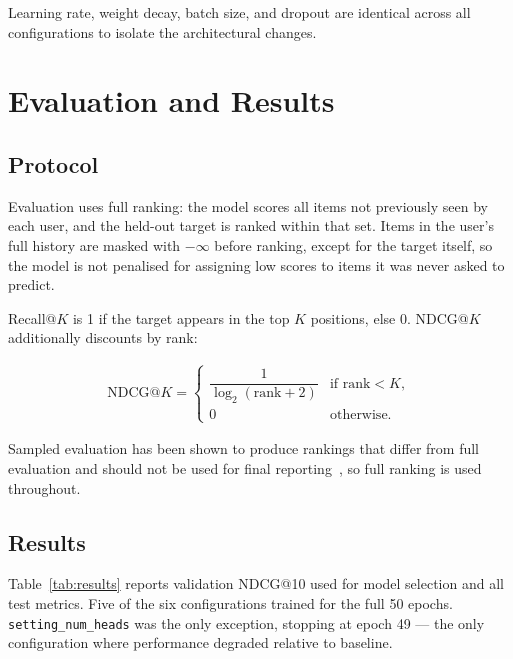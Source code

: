 \documentclass[sigconf]{acmart}
\begin{document}
Learning rate, weight decay, batch size, and dropout are identical across all
configurations to isolate the architectural changes.


\section{Evaluation and Results}

\subsection{Protocol}

Evaluation uses full ranking: the model scores all items not previously seen by
each user, and the held-out target is ranked within that set. Items in the
user's full history are masked with $-\infty$ before ranking, except for the
target itself, so the model is not penalised for assigning low scores to items
it was never asked to predict.

Recall@$K$ is 1 if the target appears in the top $K$ positions, else 0.
NDCG@$K$ additionally discounts by rank:

\begin{align}
  \text{NDCG@}K =
  \begin{cases}
    \dfrac{1}{\log_2(\text{rank} + 2)} & \text{if rank} < K, \\
    0 & \text{otherwise.}
  \end{cases}
\end{align}

Sampled evaluation has been shown to produce rankings that differ from full
evaluation and should not be used for final
reporting~\cite{krichene2020sampled}, so full ranking is used throughout.

\subsection{Results}

Table~\ref{tab:results} reports validation NDCG@10 used for model selection and
all test metrics. Five of the six configurations trained for the full 50 epochs.
\texttt{setting\_num\_heads} was the only exception, stopping at epoch 49 --- the
only configuration where performance degraded relative to baseline.
\end{document}
